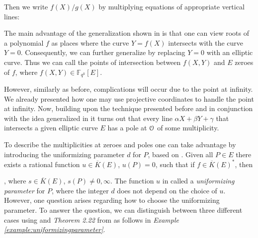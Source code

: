 Then we write $f(X)/g(X)$ by multiplying equations of appropriate vertical lines:

The main advantage of the generalization shown in  is that
one can view roots of a polynomial $f$ as places where the curve $Y = f(X)$ intersects
with the curve $Y = 0$. Consequently, we can further generalize by replacing $Y = 0$ with an elliptic curve. Thus we can call the points of intersection between $f(X, Y)$ and $E$ zeroes of $f$, where $f(X, Y) \in \mathbb{F}_{q^k}[E]$.  

However, similarly as before, complications will occur due to the point at infinity. We already presented  how one may use projective coordinates to handle the point at infinity. Now, building upon the technique presented before and in conjunction with the idea generalized in  it turns out that every line $\alpha X + \beta Y + \gamma$ that intersects a given elliptic curve $E$ has a pole at $\EuScript{O}$ of some multiplicity. 

To describe the multiplicities at zeroes and poles one can take advantage by introducing the uniformizing parameter $d$ for $P$, based on \cite{menezes2004ECC}.  Given all $P \in E$ there exists a rational function $u \in \overline{K}(E)$, $u(P) = 0$, such that if $f \in \overline{K}(E)^{*}$, then
 
, where $s \in \overline{K}(E)$, $s(P) \neq 0, \infty$.  
The function $u$  in  called a \textit{uniformizing parameter} for $P$, where the integer $d$ does not depend on the choice of $u$.  However, one question arises regarding how to choose the uniformizing parameter. To answer the question, we can distinguish between three different cases using  and \textit{Theorem 2.22} from \cite{Menezes1993} as follows in \textit{Example \ref{example:uniformizingparameter}}. 



